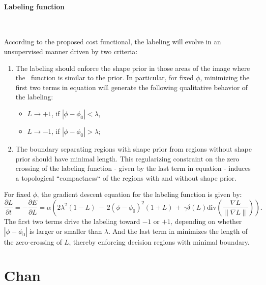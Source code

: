 \paragraph{Labeling function}
~\par \vspace{0.3cm}
According to the proposed cost functional, the labeling will evolve in an unsupervised manner driven by two criteria:
\begin{enumerate}
 \item The labeling should enforce the shape prior in those areas of the image where the \ls~function is similar to the prior. In particular, for fixed $\phi$, minimizing the first two terms in equation  will generate the following qualitative behavior of the labeling:
 \begin{itemize}
   \item $L \rightarrow +1$,  if $|\phi - \phi_0 | < \lambda$,
   \item $L \rightarrow -1$, if $|\phi - \phi_0 | > \lambda$;
 \end{itemize}
 \item The boundary separating regions with shape prior from regions without shape prior should have minimal length. This regularizing constraint on the zero crossing of the labeling function - given by the last term in equation  - induces a topological ``compactness`` of the regions with and without shape prior.
\end{enumerate}

For fixed $\phi$, the gradient descent equation for the labeling function is given by:
\begin{equation}
  \label{eq:evol_label_cremers2003b}
  \frac{\partial L}{\partial t} = -\frac{\partial E}{\partial L} = \alpha \left( 2\lambda^2(1-L) \, - \, 2(\phi - \phi_0)^2 (1+L) \, + \, \gamma \delta(L) \text{div} \left( \frac{\nabla L}{\| \nabla L \|} \right) \right).
\end{equation}
The first two terms drive the labeling toward $-1$ or $+1$, depending on whether $|\phi - \phi_0|$ is larger or smaller than $\lambda$. And the last term in  minimizes the length of the zero-crossing of $L$, thereby enforcing decision regions with minimal boundary.



\newpage
\section[Chan \etal]{Chan  \cite{Chan2005}}
\label{sec:shape-chan2005}


